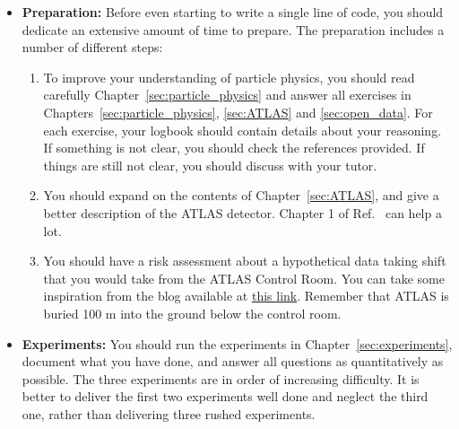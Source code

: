 \begin{itemize}
\item{\textbf{Preparation:}} Before even starting to write a single line of code, you should dedicate an extensive amount of time to prepare. The preparation includes a number of different steps:
\begin{enumerate}
\item To improve your understanding of particle physics, you should read carefully Chapter~\ref{sec:particle_physics} and answer all exercises in Chapters~\ref{sec:particle_physics}, \ref{sec:ATLAS} and \ref{sec:open_data}. For each exercise, your logbook should contain details about your reasoning. If something is not clear, you should check the references provided. If things are still not clear, you should discuss with your tutor. 
\item You should expand on the contents of Chapter~\ref{sec:ATLAS}, and give a better description of the ATLAS detector. Chapter 1 of Ref.~\cite{Aad:2008zzm} can help a lot. 
\item You should have a risk assessment about a hypothetical data taking shift that you would take from the ATLAS Control Room. You can take some inspiration from the blog available at \href{https://atlas.cern/updates/atlas-blog/how-run-particle-detector}{this link}. Remember that ATLAS is buried 100 m into the ground below the control room. 
\end{enumerate}
\item{\textbf{Experiments:}} You should run the experiments in Chapter~\ref{sec:experiments}, document what you have done, and answer all questions as quantitatively as possible. The three experiments are in order of increasing difficulty. It is better to deliver the first two experiments well done and neglect the third one, rather than delivering three rushed experiments.
\end{itemize} 

